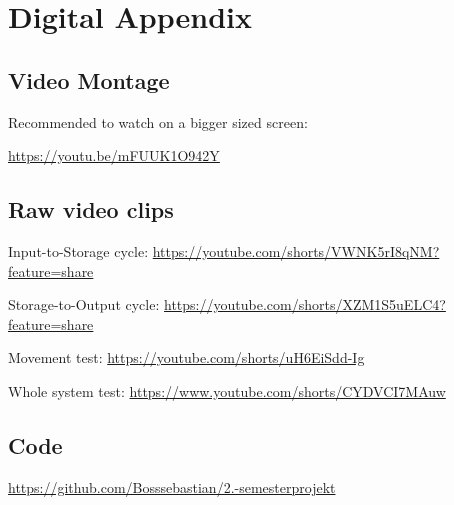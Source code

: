 \section{Digital Appendix}



\subsection{Video Montage}
Recommended to watch on a bigger sized screen:

\url{https://youtu.be/mFUUK1O942Y}


\subsection{Raw video clips}
\label{videos}
Input-to-Storage cycle:
\url{https://youtube.com/shorts/VWNK5rI8qNM?feature=share} 

Storage-to-Output cycle:
\url{https://youtube.com/shorts/XZM1S5uELC4?feature=share} 







Movement test: \url{https://youtube.com/shorts/uH6EiSdd-Ig}

Whole system test: \url{https://www.youtube.com/shorts/CYDVCI7MAuw}


\subsection{Code}

\url{https://github.com/Bosssebastian/2.-semesterprojekt}